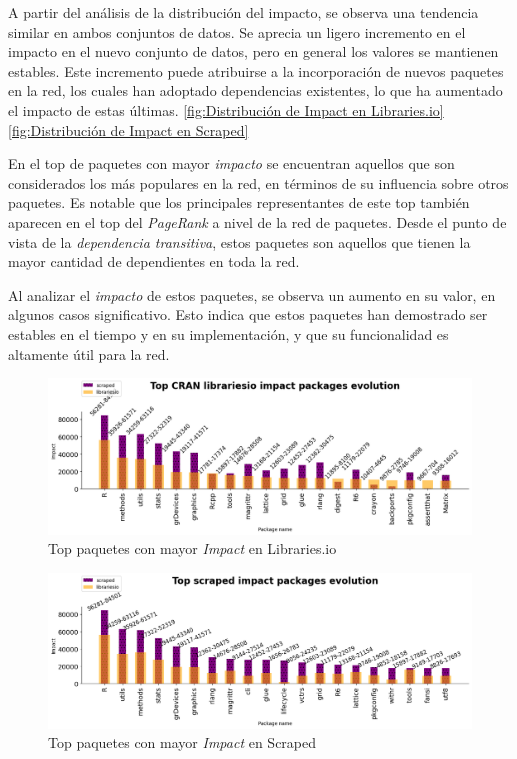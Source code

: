 A partir del análisis de la distribución del impacto, se observa una tendencia similar en ambos
conjuntos de datos. Se aprecia un ligero incremento en el impacto en el nuevo conjunto de datos,
pero en general los valores se mantienen estables. Este incremento puede atribuirse a la incorporación
de nuevos paquetes en la red, los cuales han adoptado dependencias existentes, lo que ha aumentado el
impacto de estas últimas. \ref{fig:Distribución de Impact en Libraries.io} \ref{fig:Distribución de Impact en Scraped}


En el top de paquetes con mayor \textit{impacto} se encuentran aquellos que son considerados los más populares
en la red, en términos de su influencia sobre otros paquetes. Es notable que los principales representantes
de este top también aparecen en el top del \textit{PageRank} a nivel de la red de paquetes. Desde el punto
de vista de la \textit{dependencia transitiva}, estos paquetes son aquellos que tienen la mayor cantidad de
dependientes en toda la red.

Al analizar el \textit{impacto} de estos paquetes, se observa un aumento en su valor, en algunos casos
significativo. Esto indica que estos paquetes han demostrado ser estables en el tiempo y en su implementación,
y que su funcionalidad es altamente útil para la red.

\begin{figure}[ht!]
    \begin{center}
        \includegraphics[width=1\textwidth]{img/cran/impact_top_libio.png}
        \caption{Top paquetes con mayor \textit{Impact} en Libraries.io}
        \label{fig:Top impact Libraries.io}
    \end{center}
\end{figure}

\begin{figure}[ht!]
    \begin{center}
        \includegraphics[width=1\textwidth]{img/cran/impact_top_scraped.png}
        \caption{Top paquetes con mayor \textit{Impact} en Scraped}
        \label{fig:Top impact Scraped}
    \end{center}
\end{figure}


